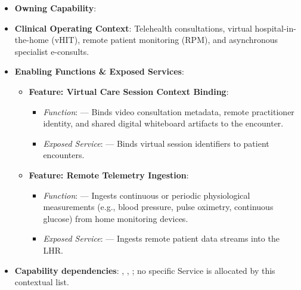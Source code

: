 \begin{itemize}

\item
\textbf{Owning Capability}: \texttt{}



\item
\textbf{Clinical Operating Context}: Telehealth consultations, virtual hospital-in-the-home (vHIT), remote patient monitoring (RPM), and asynchronous specialist e-consults.



\item
\textbf{Enabling Functions \& Exposed Services}:


\begin{itemize}

\item
\textbf{Feature: Virtual Care Session Context Binding}:


\begin{itemize}

\item
\emph{Function}: \texttt{} — Binds video consultation metadata, remote practitioner identity, and shared digital whiteboard artifacts to the encounter.



\item
\emph{Exposed Service}: \texttt{} — Binds virtual session identifiers to patient encounters.



\end{itemize}


\item
\textbf{Feature: Remote Telemetry Ingestion}:


\begin{itemize}

\item
\emph{Function}: \texttt{} — Ingests continuous or periodic physiological measurements (e.g., blood pressure, pulse oximetry, continuous glucose) from home monitoring devices.



\item
\emph{Exposed Service}: \texttt{} — Ingests remote patient data streams into the LHR.



\end{itemize}


\end{itemize}


\item
\textbf{Capability dependencies}: \texttt{}, \texttt{}, \texttt{}; no specific Service is allocated by this contextual list.



\end{itemize}
